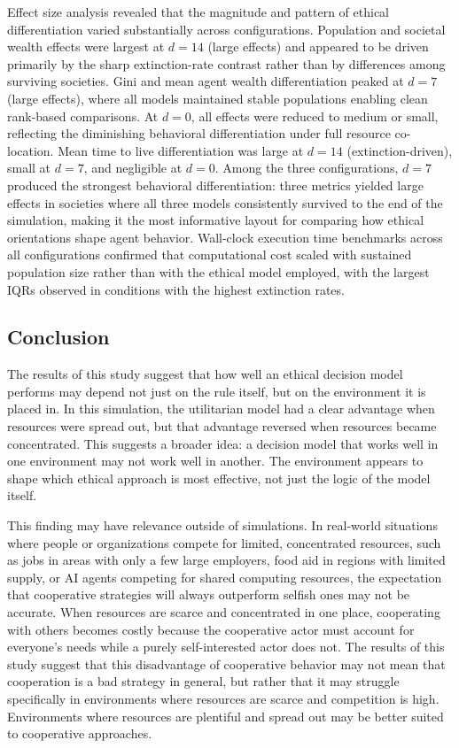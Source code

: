 \documentclass{icsthesis}
\begin{document}
\begin{mainmatter}
Effect size analysis revealed that the magnitude and pattern of ethical differentiation varied substantially across configurations. Population and societal wealth effects were largest at $d = 14$ (large effects) and appeared to be driven primarily by the sharp extinction-rate contrast rather than by differences among surviving societies. Gini and mean agent wealth differentiation peaked at $d = 7$ (large effects), where all models maintained stable populations enabling clean rank-based comparisons. At $d = 0$, all effects were reduced to medium or small, reflecting the diminishing behavioral differentiation under full resource co-location. Mean time to live differentiation was large at $d = 14$ (extinction-driven), small at $d = 7$, and negligible at $d = 0$. Among the three configurations, $d = 7$ produced the strongest behavioral differentiation: three metrics yielded large effects in societies where all three models consistently survived to the end of the simulation, making it the most informative layout for comparing how ethical orientations shape agent behavior. Wall-clock execution time benchmarks across all configurations confirmed that computational cost scaled with sustained population size rather than with the ethical model employed, with the largest IQRs observed in conditions with the highest extinction rates.

		\subsection{Conclusion}

The results of this study suggest that how well an ethical decision model performs may depend not just on the rule itself, but on the environment it is placed in. In this simulation, the utilitarian model had a clear advantage when resources were spread out, but that advantage reversed when resources became concentrated. This suggests a broader idea: a decision model that works well in one environment may not work well in another. The environment appears to shape which ethical approach is most effective, not just the logic of the model itself.

This finding may have relevance outside of simulations. In real-world situations where people or organizations compete for limited, concentrated resources, such as jobs in areas with only a few large employers, food aid in regions with limited supply, or AI agents competing for shared computing resources, the expectation that cooperative strategies will always outperform selfish ones may not be accurate. When resources are scarce and concentrated in one place, cooperating with others becomes costly because the cooperative actor must account for everyone's needs while a purely self-interested actor does not. The results of this study suggest that this disadvantage of cooperative behavior may not mean that cooperation is a bad strategy in general, but rather that it may struggle specifically in environments where resources are scarce and competition is high. Environments where resources are plentiful and spread out may be better suited to cooperative approaches.


\end{mainmatter}
\end{document}
